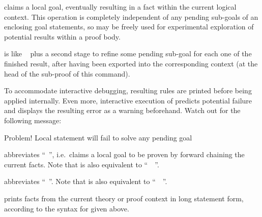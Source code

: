\begin{isabellebody}
\begin{isamarkuptext}
\begin{descr}
  \item [\mbox{\isa{\isacommand{have}}}~\isa{{\isachardoublequote}a{\isacharcolon}\ {\isasymphi}{\isachardoublequote}}] claims a local goal,
  eventually resulting in a fact within the current logical context.
  This operation is completely independent of any pending sub-goals of
  an enclosing goal statements, so \mbox{} may be freely
  used for experimental exploration of potential results within a
  proof body.
  
  \item [\mbox{\isa{\isacommand{show}}}~\isa{{\isachardoublequote}a{\isacharcolon}\ {\isasymphi}{\isachardoublequote}}] is like \mbox{}~ plus a second stage to refine some pending
  sub-goal for each one of the finished result, after having been
  exported into the corresponding context (at the head of the
  sub-proof of this \mbox{} command).
  
  To accommodate interactive debugging, resulting rules are printed
  before being applied internally.  Even more, interactive execution
  of \mbox{} predicts potential failure and displays the
  resulting error as a warning beforehand.  Watch out for the
  following message:

  \begin{ttbox}
  Problem! Local statement will fail to solve any pending goal
  \end{ttbox}
  
  \item [\mbox{\isa{\isacommand{hence}}}] abbreviates ``\mbox{}~\mbox{}'', i.e.\ claims a local goal to be proven by forward
  chaining the current facts.  Note that \mbox{} is also
  equivalent to ``\mbox{}~~\mbox{}''.
  
  \item [\mbox{\isa{\isacommand{thus}}}] abbreviates ``\mbox{}~\mbox{}''.  Note that \mbox{} is also equivalent to
  ``\mbox{}~~\mbox{}''.
  
  \item [\mbox{\isa{\isacommand{print{\isacharunderscore}statement}}}~\isa{a}] prints facts from the
  current theory or proof context in long statement form, according to
  the syntax for \mbox{} given above.


\end{descr}
\end{isamarkuptext}
\end{isabellebody}
